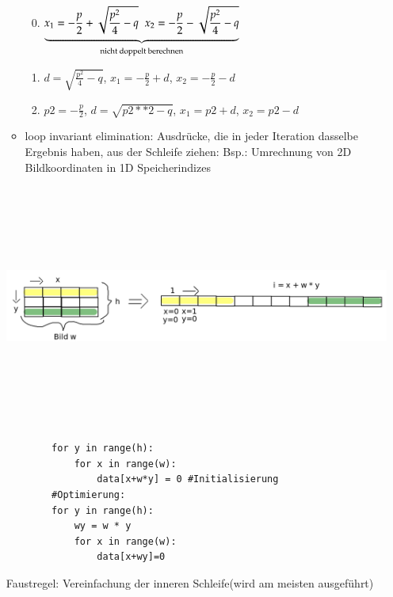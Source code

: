 \begin{itemize}
\begin{itemize}
            \begin{enumerate}
                \setcounter{enumi}{-1}
                \item $\underbrace{ x_1= -\frac{p}{2} + \sqrt{\frac{p^2}{4} - q}\hspace*{2mm}x_2= -\frac{p}{2} - \sqrt{\frac{p^2}{4} -q}}_{\text{nicht doppelt berechnen}}$
                \item $d = \sqrt{\frac{p^2}{4} - q}$,\hspace*{2mm} $x_1 = -\frac{p}{2} + d $,\hspace*{2mm} $x_2 =- \frac{p}{2} - d$
                \item $p2 = -\frac{p}{2}$, \hspace*{2mm}$d= \sqrt{p2**2-q}$,\hspace*{2mm} $x_1 = p2 + d$, \hspace*{2mm}$x_2 = p2 - d$
            \end{enumerate}
            \vspace*{2mm}
            \item \glqq loop invariant elimination\grqq : Ausdrücke, die in jeder Iteration dasselbe Ergebnis haben, aus der Schleife ziehen: Bsp.: Umrechnung von 2D Bildkoordinaten in 1D Speicherindizes
        \end{itemize}
        \includegraphics[width=15cm,height=8cm,keepaspectratio]{./Pictures/2D1D.png}
        \begin{verbatim}
        for y in range(h):
            for x in range(w):
                data[x+w*y] = 0 #Initialisierung
        #Optimierung:
        for y in range(h):
            wy = w * y
            for x in range(w):
                data[x+wy]=0
        \end{verbatim}
        Faustregel: \glqq Vereinfachung der inneren Schleife\grqq  (wird am meisten ausgeführt)\\

\end{itemize}

